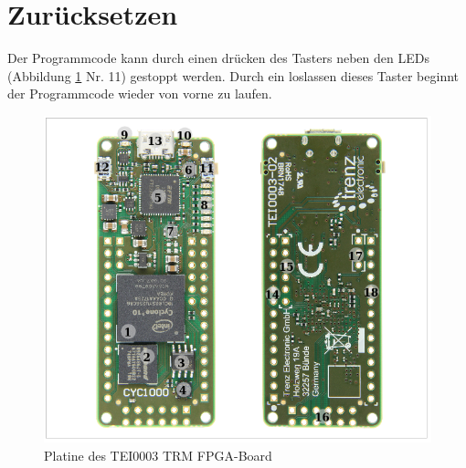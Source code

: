     \section{Zurücksetzen}
        Der Programmcode kann durch einen drücken des Tasters neben den LEDs
        (Abbildung \ref{fig:reset} Nr. 11) gestoppt werden. Durch ein loslassen
        dieses Taster beginnt der Programmcode wieder von vorne zu laufen.

        \begin{figure}[H]
            \centering
            \includegraphics[scale=0.5]{img/fpga_board_layout.png}
            \caption[Platine des TEI0003 TRM FPGA-Board]{Platine des TEI0003 TRM FPGA-Board \cite{terz} }
            \label{fig:reset}
        \end{figure}

